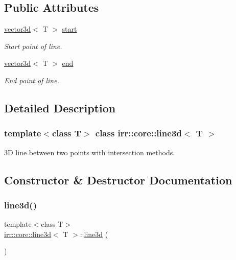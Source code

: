 \subsection*{Public Attributes}
\begin{DoxyCompactItemize}
\item 
\mbox{\label{classirr_1_1core_1_1line3d_a8874f77324b6ef6632e66b22051a3251}} 
\hyperlink{classirr_1_1core_1_1vector3d}{vector3d}$<$ T $>$ \hyperlink{classirr_1_1core_1_1line3d_a8874f77324b6ef6632e66b22051a3251}{start}
\begin{DoxyCompactList}\small\item\em Start point of line. \end{DoxyCompactList}\item 
\mbox{\label{classirr_1_1core_1_1line3d_aea19cb33971bb20e1d736facdae8a8f0}} 
\hyperlink{classirr_1_1core_1_1vector3d}{vector3d}$<$ T $>$ \hyperlink{classirr_1_1core_1_1line3d_aea19cb33971bb20e1d736facdae8a8f0}{end}
\begin{DoxyCompactList}\small\item\em End point of line. \end{DoxyCompactList}\end{DoxyCompactItemize}


\subsection{Detailed Description}
\subsubsection*{template$<$class T$>$\newline
class irr\+::core\+::line3d$<$ T $>$}

3D line between two points with intersection methods. 

\subsection{Constructor \& Destructor Documentation}
\mbox{\label{classirr_1_1core_1_1line3d_ab88640572a102a9eebd1bf483b7d7e75}} 
\subsubsection{\texorpdfstring{line3d()}{line3d()}}
{\footnotesize\ttfamily template$<$class T$>$ \\
\hyperlink{classirr_1_1core_1_1line3d}{irr\+::core\+::line3d}$<$ T $>$\+::\hyperlink{classirr_1_1core_1_1line3d}{line3d} (\begin{DoxyParamCaption}{ }\end{DoxyParamCaption})\hspace{0.3cm}{\ttfamily [inline]}}



